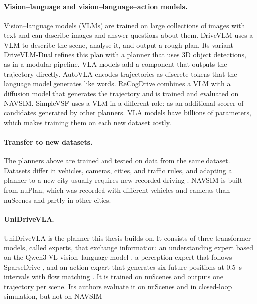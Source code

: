 \documentclass[11pt, a4paper, oneside]{book}
\begin{document}
\paragraph{Vision--language and vision--language--action models.}
Vision--language models (VLMs) are trained on large collections of images with text and can
describe images and answer questions about them. DriveVLM \cite{drivevlm} uses a VLM to describe
the scene, analyse it, and output a rough plan. Its variant DriveVLM-Dual refines this plan with
a planner that uses 3D object detections, as in a modular pipeline. VLA models add a component that outputs the trajectory directly.
AutoVLA \cite{autovla} encodes trajectories as discrete tokens that the language model generates
like words. ReCogDrive \cite{recogdrive} combines a VLM with a diffusion model that generates the
trajectory and is trained and evaluated on NAVSIM. SimpleVSF
\cite{simplevsf} uses a VLM in a different role: as an additional scorer of candidates
generated by other planners. VLA models have billions of parameters, which makes training them
on each new dataset costly.

\paragraph{Transfer to new datasets.}
The planners above are trained and tested on data from the same dataset. Datasets differ in
vehicles, cameras, cities, and traffic rules, and adapting a planner to a new city usually
requires new recorded driving \cite{nomad}. NAVSIM is built from nuPlan, which was recorded with
different vehicles and cameras than nuScenes and partly in other cities.

\paragraph{UniDriveVLA.}
UniDriveVLA \cite{unidrivevla} is the planner this thesis builds on. It consists of three
transformer models, called experts, that exchange information: an understanding expert based
on the Qwen3-VL vision--language model \cite{qwen3vl}, a perception expert that follows SparseDrive
\cite{sparsedrive}, and an action expert that generates six future positions at
\SI{0.5}{\second} intervals with flow matching \cite{flowmatching}. It is trained on nuScenes and
outputs one trajectory per scene. Its authors evaluate it on nuScenes and in closed-loop
simulation, but not on NAVSIM.
\end{document}
